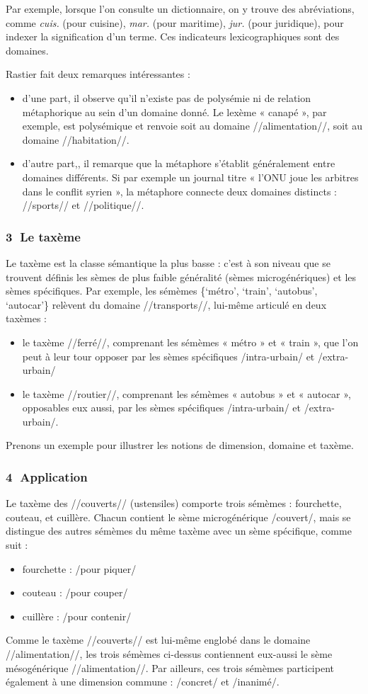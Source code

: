 Par exemple, lorsque l’on consulte un dictionnaire, on y trouve des abréviations, comme \textit{cuis.} (pour cuisine), \textit{mar.} (pour maritime), \textit{jur.} (pour juridique), pour indexer la signification d’un terme. Ces indicateurs lexicographiques sont des domaines.

Rastier fait deux remarques intéressantes :
\begin{itemize}
\item d’une part, il observe qu’il n’existe pas de polysémie ni de relation métaphorique au sein d’un domaine donné. Le lexème « canapé », par exemple, est polysémique et renvoie soit au domaine //alimentation//, soit au domaine //habitation//.
\item d’autre part,, il remarque que la métaphore s’établit généralement entre domaines différents. Si par exemple un journal titre « l’ONU joue les arbitres dans le conflit syrien », la métaphore connecte deux domaines distincts : //sports// et //politique//.
\end{itemize}

\subsubsection*{\textcircled{\scriptsize 3} Le taxème}
Le taxème est la classe sémantique la plus basse : c’est à son niveau que se trouvent définis les sèmes de plus faible généralité (sèmes microgénériques) et les sèmes spécifiques. Par exemple, les sémèmes \{‘métro’, ‘train’, ‘autobus’, ‘autocar’\} relèvent du domaine //transports//, lui-même articulé en deux taxèmes :
\begin{itemize}
\item le taxème //ferré//, comprenant les sémèmes « métro » et « train », que l’on peut à leur tour opposer par les sèmes spécifiques /intra-urbain/ et /extra-urbain/
\item le taxème //routier//, comprenant les sémèmes « autobus » et « autocar », opposables eux aussi, par les sèmes spécifiques /intra-urbain/ et /extra-urbain/.
\end{itemize}
Prenons un exemple pour illustrer les notions de dimension, domaine et taxème.

\subsubsection*{\textcircled{\scriptsize 4} Application}
Le taxème des //couverts// (ustensiles) comporte trois sémèmes : fourchette, couteau, et cuillère.
Chacun contient le sème microgénérique /couvert/, mais se distingue des autres sémèmes du même taxème avec un sème spécifique, comme suit :
\begin{itemize}
\item fourchette : /pour piquer/
\item couteau : /pour couper/
\item cuillère : /pour contenir/
\end{itemize}
Comme le taxème //couverts// est lui-même englobé dans le domaine //alimentation//, les trois sémèmes ci-dessus contiennent eux-aussi le sème mésogénérique //alimentation//. Par ailleurs, ces trois sémèmes participent également à une dimension commune : /concret/ et /inanimé/.

